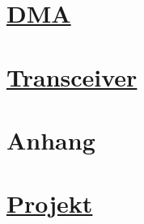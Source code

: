 \documentclass[11pt,german]{scrartcl}
\begin{document}
\clearpage
\section
{\href{http://cst.mi.fu-berlin.de/intern/19606-P-MPP/Aufgaben/041000.html}
{DMA}}



\clearpage
\section
{\href{http://cst.mi.fu-berlin.de/intern/19606-P-MPP/Aufgaben/041100.html}
{Transceiver}}




\clearpage
\section{Anhang}




\clearpage
\section{\href{http://cst.mi.fu-berlin.de/intern/19606-P-MPP/Aufgaben/041200.html}
{Projekt}}


\end{document}
